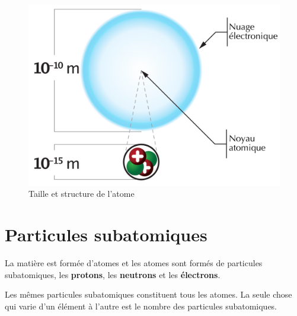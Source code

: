 \documentclass[
  11pt,
  a4paper,
  openany]{book}
\begin{document}
\begin{figure}

{\centering \includegraphics[width=0.33\linewidth]{images/ordre-grandeur-atome} 

}

\caption{Taille et structure de l'atome}\label{fig:ordre-grandeur-atome}
\end{figure}

\hypertarget{particules-subatomiques}{%
\section{Particules subatomiques}\label{particules-subatomiques}}

La matière est formée d'atomes et les atomes sont formés de particules subatomiques, les \textbf{protons}, les \textbf{neutrons} et les \textbf{électrons}.

Les mêmes particules subatomiques constituent tous les atomes. La seule chose qui varie d'un élément à l'autre est le nombre des particules subatomiques.
\end{document}

